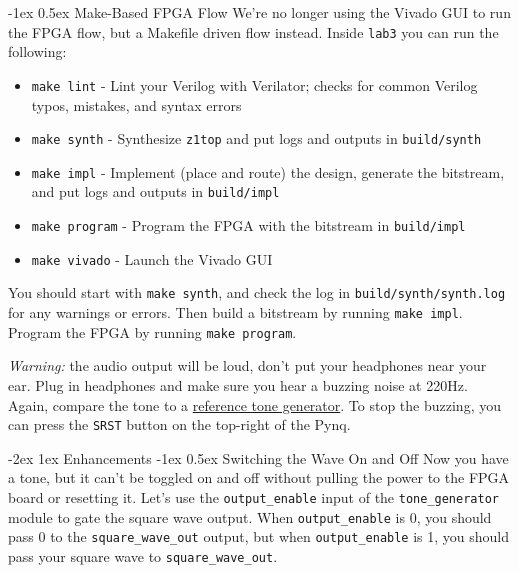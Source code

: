 \documentclass[11pt]{article}
\makeatletter
\renewcommand{\section}
{\@startsection {section}{1}{0pt}
 {-2ex}
 {1ex}
 {\bfseries\Large}}
\renewcommand{\subsection}
{\@startsection {subsection}{1}{0pt}
 {-1ex}
 {0.5ex}
 {\bfseries\normalsize}}
\makeatother
\begin{document}
\subsection{Make-Based FPGA Flow}
We're no longer using the Vivado GUI to run the FPGA flow, but a Makefile driven flow instead.
Inside \verb|lab3| you can run the following:
\begin{itemize}
  \item \verb|make lint| - Lint your Verilog with Verilator; checks for common Verilog typos, mistakes, and syntax errors
  \item \verb|make synth| - Synthesize \verb|z1top| and put logs and outputs in \verb|build/synth|
  \item \verb|make impl| - Implement (place and route) the design, generate the bitstream, and put logs and outputs in \verb|build/impl|
  \item \verb|make program| - Program the FPGA with the bitstream in \verb|build/impl|
  \item \verb|make vivado| - Launch the Vivado GUI
\end{itemize}

You should start with \verb|make synth|, and check the log in \texttt{build/synth/synth.log} for any warnings or errors.
Then build a bitstream by running \verb|make impl|.
Program the FPGA by running \texttt{make program}.

\textit{Warning:} the audio output will be loud, don't put your headphones near your ear.
Plug in headphones and make sure you hear a buzzing noise at 220Hz.
Again, compare the tone to a \href{https://www.szynalski.com/tone-generator/}{reference tone generator}.
To stop the buzzing, you can press the \verb|SRST| button on the top-right of the Pynq.

\section{Enhancements}
\subsection{Switching the Wave On and Off}
Now you have a tone, but it can't be toggled on and off without pulling the power to the FPGA board or resetting it.
Let's use the \verb|output_enable| input of the \verb|tone_generator| module to gate the square wave output.
When \verb|output_enable| is 0, you should pass 0 to the \verb|square_wave_out| output, but when \verb|output_enable| is 1, you should pass your square wave to \verb|square_wave_out|.
\end{document}
